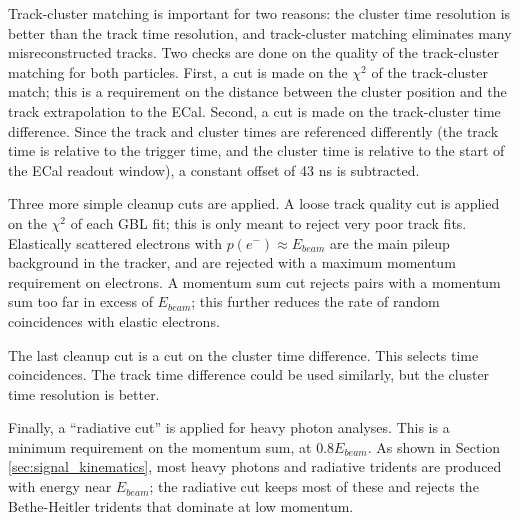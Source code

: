 Track-cluster matching is important for two reasons: the cluster time resolution is better than the track time resolution, and track-cluster matching eliminates many misreconstructed tracks.
Two checks are done on the quality of the track-cluster matching for both particles.
First, a cut is made on the $\chi^2$ of the track-cluster match; this is a requirement on the distance between the cluster position and the track extrapolation to the ECal.
Second, a cut is made on the track-cluster time difference.
Since the track and cluster times are referenced differently (the track time is relative to the trigger time, and the cluster time is relative to the start of the ECal readout window), a constant offset of 43 ns is subtracted.

Three more simple cleanup cuts are applied.
A loose track quality cut is applied on the $\chi^2$ of each GBL fit; this is only meant to reject very poor track fits.
Elastically scattered electrons with $p(e^-)\approx E_{beam}$ are the main pileup background in the tracker, and are rejected with a maximum momentum requirement on electrons.
A momentum sum cut rejects pairs with a momentum sum too far in excess of $E_{beam}$; this further reduces the rate of random coincidences with elastic electrons.

The last cleanup cut is a cut on the cluster time difference.
This selects time coincidences.
The track time difference could be used similarly, but the cluster time resolution is better.

Finally, a ``radiative cut'' is applied for heavy photon analyses.
This is a minimum requirement on the momentum sum, at $0.8E_{beam}$.
As shown in Section \ref{sec:signal_kinematics}, most heavy photons and radiative tridents are produced with energy near $E_{beam}$; the radiative cut keeps most of these and rejects the Bethe-Heitler tridents that dominate at low momentum.

